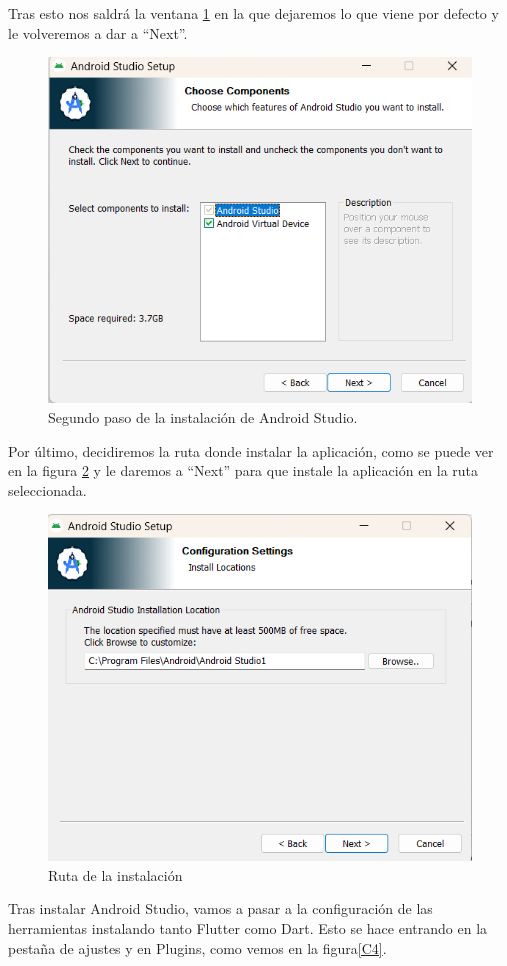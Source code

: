Tras esto nos saldrá la ventana \ref{C2} en la que dejaremos lo que viene por defecto y le volveremos a dar a ``Next''.
\begin{figure}[H]
    \centering
    \includegraphics[width=0.8\linewidth]{AndroidStudio2.png}
    \caption{Segundo paso de la instalación de Android Studio.}
    \label{C2}
\end{figure}

Por último, decidiremos la ruta donde instalar la aplicación, como se puede ver en la figura \ref{C3} y le daremos a ``Next'' para que instale la aplicación en la ruta seleccionada.
\begin{figure}[H]
    \centering
    \includegraphics[width=0.8\linewidth]{AndroidStudio3.png}
    \caption{Ruta de la instalación}
    \label{C3}
\end{figure}

Tras instalar Android Studio, vamos a pasar a la configuración de las herramientas instalando tanto Flutter como Dart.
Esto se hace entrando en la pestaña de ajustes y en Plugins, como vemos en la figura\ref{C4}.

